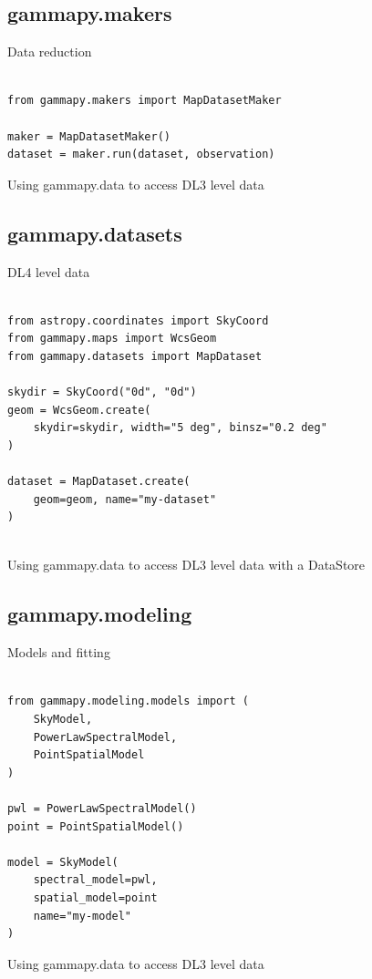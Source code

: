 \subsection{gammapy.makers}
Data reduction

\begin{listing}
\begin{verbatim}

from gammapy.makers import MapDatasetMaker

maker = MapDatasetMaker()
dataset = maker.run(dataset, observation)

\end{verbatim}
\caption{Using gammapy.data to access DL3 level data}
\label{codeexample:maker}
\end{listing}


\subsection{gammapy.datasets}
DL4 level data


\begin{listing}
\begin{verbatim}

from astropy.coordinates import SkyCoord
from gammapy.maps import WcsGeom
from gammapy.datasets import MapDataset

skydir = SkyCoord("0d", "0d")
geom = WcsGeom.create(
	skydir=skydir, width="5 deg", binsz="0.2 deg"
)

dataset = MapDataset.create(
	geom=geom, name="my-dataset"
)


\end{verbatim}
\caption{Using gammapy.data to access DL3 level data with a DataStore}
\label{codeexample:data}
\end{listing}



\subsection{gammapy.modeling}
Models and fitting

\begin{listing}
\begin{verbatim}

from gammapy.modeling.models import (
	SkyModel,
	PowerLawSpectralModel,
	PointSpatialModel
)

pwl = PowerLawSpectralModel()
point = PointSpatialModel()

model = SkyModel(
	spectral_model=pwl,
	spatial_model=point
	name="my-model"
)
\end{verbatim}
\caption{Using gammapy.data to access DL3 level data}
\label{codeexample:maker}
\end{listing}


